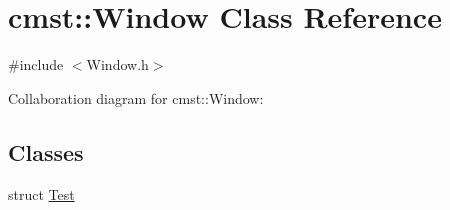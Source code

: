 \hypertarget{classcmst_1_1_window}{}\section{cmst\+:\+:Window Class Reference}
\label{classcmst_1_1_window}


{\ttfamily \#include $<$Window.\+h$>$}



Collaboration diagram for cmst\+:\+:Window\+:
\subsection*{Classes}
\begin{DoxyCompactItemize}
\item 
struct \hyperlink{structcmst_1_1_window_1_1_test}{Test}
\end{DoxyCompactItemize}
